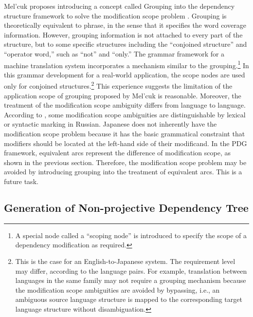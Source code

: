 \documentclass[english]{jnlp_1.4_rep}
\theoremstyle{break}
\theoremstyle{plain}
\theoremstyle{plain}
\begin{document}
Mel'cuk proposes introducing a concept called Grouping into the
dependency structure framework to solve the modification scope problem
\cite{Melcuk88}. Grouping is theoretically equivalent to phrase, in
the sense that it specifies the word coverage information. However,
grouping information is not attached to every part of the structure,
but to some specific structures including the ``conjoined structure''
and ``operator word,'' such as ``not'' and ``only.'' The grammar
framework for a machine translation system \cite{Amano89} incorporates
a mechanism similar to the grouping.\footnote{A special node called a
  ``scoping node'' is introduced to specify the scope of a dependency
  modification as required.} In this grammar development for a
real-world application, the scope nodes are used only for conjoined
structures.\footnote{This is the case for an English-to-Japanese
  system. The requirement level may differ, according to the language
  pairs. For example, translation between languages in the same family
  may not require a grouping mechanism because the modification scope
  ambiguities are avoided by bypassing, i.e., an ambiguous source
  language structure is mapped to the corresponding target language
  structure without disambiguation.}  This experience suggests the
limitation of the application scope of grouping proposed by Mel'cuk is
reasonable.  Moreover, the treatment of the modification scope
ambiguity differs from language to language. According to
\cite{Melcuk88}, some modification scope ambiguities are
distinguishable by lexical or syntactic marking in Russian. Japanese
does not inherently have the modification scope problem because it has
the basic grammatical constraint that modifiers should be located at
the left-hand side of their modificand. In the PDG framework,
equivalent arcs represent the difference of modification scope, as
shown in the previous section. Therefore, the modification scope
problem may be avoided by introducing grouping into the treatment of
equivalent arcs. This is a future task.


\subsection{Generation of Non-projective Dependency Tree}
\label{sec:NonProjectivity}
\end{document}
